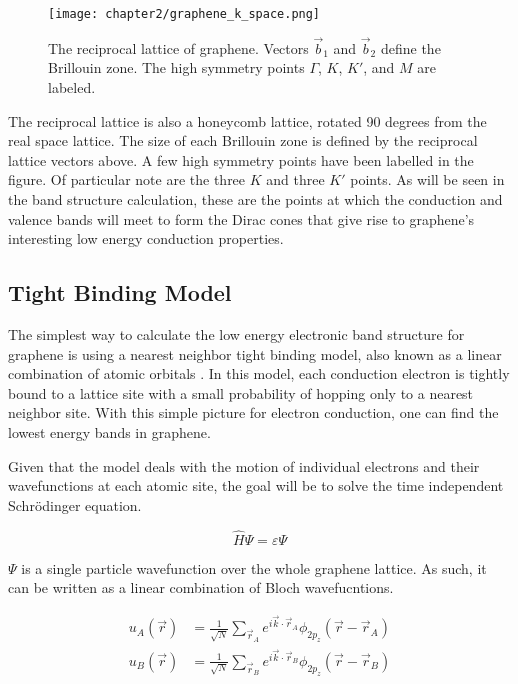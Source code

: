 \begin{figure}
    \centering
    \texttt{[image: chapter2/graphene\_k\_space.png]}
    \caption{The reciprocal lattice of graphene. Vectors $\vec{b}_1$ and $\vec{b}_2$ define the Brillouin zone. The high symmetry points $\Gamma$, $K$, $K'$, and $M$ are labeled.}
    \label{fig:graphene_k_space}
\end{figure}

The reciprocal lattice is also a honeycomb lattice, rotated 90 degrees from the real space lattice. The size of each Brillouin zone is defined by the reciprocal lattice vectors above. A few high symmetry points have been labelled in the figure. Of particular note are the three $K$ and three $K'$ points. As will be seen in the band structure calculation, these are the points at which the conduction and valence bands will meet to form the Dirac cones that give rise to graphene's interesting low energy conduction properties.

\subsection{Tight Binding Model}

The simplest way to calculate the low energy electronic band structure for graphene is using a nearest neighbor tight binding model, also known as a linear combination of atomic orbitals \cite{Charlier2007, Ibach2010}. In this model, each conduction electron is tightly bound to a lattice site with a small probability of hopping only to a nearest neighbor site. With this simple picture for electron conduction, one can find the lowest energy bands in graphene.

Given that the model deals with the motion of individual electrons and their wavefunctions at each atomic site, the goal will be to solve the time independent Schr\"{o}dinger equation.

\begin{equation}
    \hat{H}\Psi = \varepsilon\Psi
\end{equation}

$\Psi$ is a single particle wavefunction over the whole graphene lattice. As such, it can be written as a linear combination of Bloch wavefucntions.

\begin{align}
    u_A(\vec{r}) &= \frac{1}{\sqrt{N}}\sum_{\vec{r}_A}^{} e^{i\vec{k}\cdot\vec{r}_A} \phi_{2p_z}(\vec{r}-\vec{r}_A) \\
    u_B(\vec{r}) &= \frac{1}{\sqrt{N}}\sum_{\vec{r}_B}^{} e^{i\vec{k}\cdot\vec{r}_B} \phi_{2p_z}(\vec{r}-\vec{r}_B)
\end{align}

